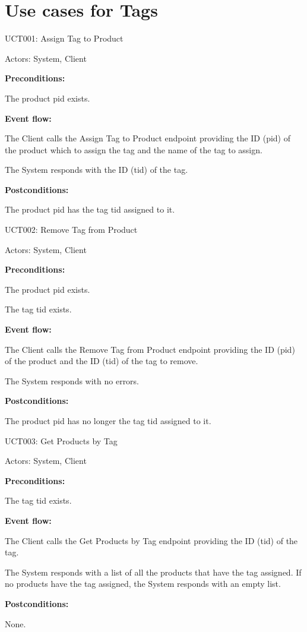 \section{Use cases for Tags}

\begin{ucbox}{UCT001: Assign Tag to Product}
\label{UCT001}

Actors: System, Client

\textbf{Preconditions:}

\ucitem The product pid exists.

\textbf{Event flow:}

\ucitem The Client calls the Assign Tag to Product endpoint providing the ID (pid) of the product which to assign the tag and the name of the tag to assign.

\ucitem The System responds with the ID (tid) of the tag.

\textbf{Postconditions:}

\ucitem The product pid has the tag tid assigned to it.

\end{ucbox}

\begin{ucbox}{UCT002: Remove Tag from Product}
\label{UCT002}

Actors: System, Client

\textbf{Preconditions:}

\ucitem The product pid exists.

\ucitem The tag tid exists.

\textbf{Event flow:}

\ucitem The Client calls the Remove Tag from Product endpoint providing the ID (pid) of the product and the ID (tid) of the tag to remove.

\ucitem The System responds with no errors.

\textbf{Postconditions:}

\ucitem The product pid has no longer the tag tid assigned to it.

\end{ucbox}

\begin{ucbox}{UCT003: Get Products by Tag}
\label{UCT003}

Actors: System, Client

\textbf{Preconditions:}

\ucitem The tag tid exists.

\textbf{Event flow:}

\ucitem The Client calls the Get Products by Tag endpoint providing the ID (tid) of the tag.

\ucitem The System responds with a list of all the products that have the tag assigned. If no products have the tag assigned, the System responds with an empty list.

\textbf{Postconditions:}

\ucitem None.

\end{ucbox}

